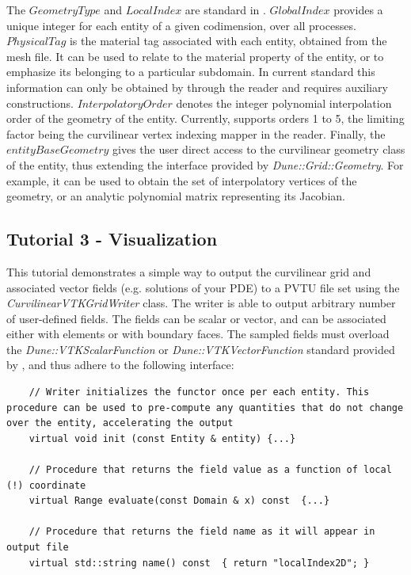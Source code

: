 \noindent
The $GeometryType$ and $LocalIndex$ are standard in \dune{}. $GlobalIndex$ provides a unique integer for each entity of a given codimension, over all processes. $PhysicalTag$ is the material tag associated with each entity, obtained from the mesh file. It can be used to relate to the material property of the entity, or to emphasize its belonging to a particular subdomain. In current \dunegrid{} standard this information can only be obtained by through the reader and requires auxiliary constructions. $InterpolatoryOrder$ denotes the integer polynomial interpolation order of the geometry of the entity. Currently, \curvgrid{} supports orders 1 to 5, the limiting factor being the curvilinear vertex indexing mapper in the reader. Finally, the $entityBaseGeometry$ gives the user direct access to the curvilinear geometry class of the entity, thus extending the interface provided by \textit{Dune::Grid::Geometry}. For example, it can be used to obtain the set of interpolatory vertices of the geometry, or an analytic polynomial matrix representing its Jacobian. \\






\subsection{Tutorial 3 - Visualization}
\label{usage-howto-tutorial-visualisation}

This tutorial demonstrates a simple way to output the curvilinear grid and associated vector fields (e.g. solutions of your PDE) to a PVTU file set using the \textit{CurvilinearVTKGridWriter} class. The writer is able to output arbitrary number of user-defined fields. The fields can be scalar or vector, and can be associated either with elements or with boundary faces. The sampled fields must overload the \textit{Dune::VTKScalarFunction} or \textit{Dune::VTKVectorFunction} standard provided by \curvgrid{}, and thus adhere to the following interface: \\

\begin{mybox}
\begin{lstlisting}
    // Writer initializes the functor once per each entity. This procedure can be used to pre-compute any quantities that do not change over the entity, accelerating the output
    virtual void init (const Entity & entity) {...}

    // Procedure that returns the field value as a function of local (!) coordinate
    virtual Range evaluate(const Domain & x) const  {...}

    // Procedure that returns the field name as it will appear in output file
    virtual std::string name() const  { return "localIndex2D"; }
\end{lstlisting}
\end{mybox}

